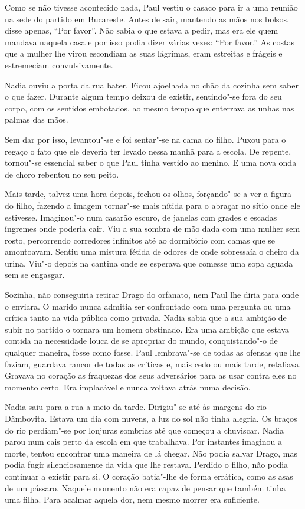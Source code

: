 Como se não tivesse acontecido nada, Paul vestiu o casaco para ir a uma
reunião na sede do partido em Bucareste. Antes de sair, mantendo as
mãos nos bolsos, disse apenas, ``Por favor''. Não sabia o que estava a
pedir, mas era ele quem mandava naquela casa e por isso podia dizer
várias vezes: ``Por favor.'' As costas que a mulher lhe virou escondiam as
suas lágrimas, eram estreitas e frágeis e estremeciam convulsivamente.

Nadia ouviu a porta da rua bater. Ficou ajoelhada no chão da cozinha sem
saber o que fazer. Durante algum tempo deixou de existir, sentindo"-se
fora do seu corpo, com os sentidos embotados, ao mesmo tempo que enterrava as unhas nas palmas das mãos.

Sem dar por isso, levantou"-se e foi sentar"-se na cama do filho. Puxou
para o regaço o fato que ele deveria ter levado nessa manhã para a
escola. De repente, tornou"-se essencial saber o que Paul tinha vestido
ao menino. E uma nova onda de choro rebentou no seu peito.

Mais tarde, talvez uma hora depois, fechou os olhos, forçando"-se a ver a
figura do filho, fazendo a imagem tornar"-se mais nítida para o abraçar
no sítio onde ele estivesse. Imaginou"-o num casarão escuro, de janelas
com grades e escadas íngremes onde poderia cair. Viu a sua sombra de mão
dada com uma mulher sem rosto, percorrendo corredores infinitos até ao
dormitório com camas que se amontoavam. Sentiu uma mistura fétida de
odores de onde sobressaía o cheiro da urina. Viu"-o depois na cantina
onde se esperava que comesse uma sopa aguada sem se engasgar.

Sozinha, não conseguiria retirar Drago do orfanato, nem Paul lhe diria
para onde o enviara. O marido nunca admitia ser confrontado com uma
pergunta ou uma crítica tanto na vida pública como privada. Nadia sabia
que a sua ambição de subir no partido o tornara um homem obstinado. Era
uma ambição que estava contida na necessidade louca de se apropriar do
mundo, conquistando"-o de qualquer maneira, fosse como fosse. Paul
lembrava"-se de todas as ofensas que lhe faziam, guardava rancor de todas
as críticas e, mais cedo ou mais tarde, retaliava. Gravava no coração as
fraquezas dos seus adversários para as usar contra eles no momento
certo. Era implacável e nunca voltava atrás numa decisão.

Nadia saiu
para a rua a meio da tarde. Dirigiu"-se até às margens do rio Dâmbovita.
Estava um dia com nuvens, a
luz do sol não tinha alegria. Os braços do rio perdiam"-se por lonjuras
sombrias até que começou a chuviscar. Nadia parou num cais perto da
escola em que trabalhava. Por instantes imaginou a morte, tentou
encontrar uma maneira de lá chegar. Não podia salvar Drago, mas podia
fugir silenciosamente da vida que lhe restava. Perdido o filho, não
podia continuar a existir para si. O coração batia"-lhe de forma
errática, como as asas de um pássaro. Naquele momento não era capaz de
pensar que também tinha uma filha. Para acalmar aquela dor, nem mesmo
morrer era suficiente.

